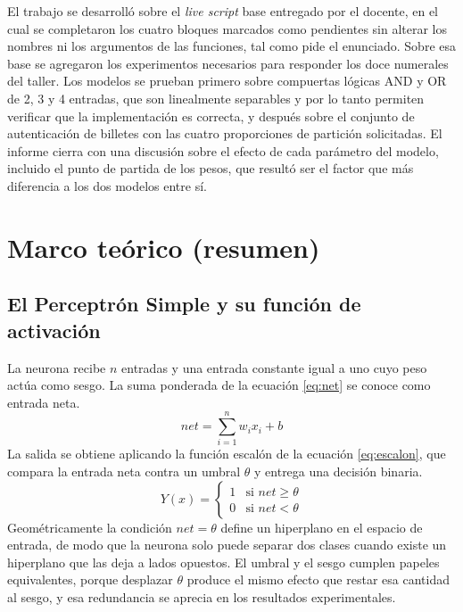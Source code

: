 \documentclass[11pt,letterpaper]{article}
\begin{document}
El trabajo se desarrolló sobre el \textit{live script} base entregado por el docente, en el cual se completaron los cuatro bloques marcados como pendientes sin alterar los nombres ni los argumentos de las funciones, tal como pide el enunciado. Sobre esa base se agregaron los experimentos necesarios para responder los doce numerales del taller. Los modelos se prueban primero sobre compuertas lógicas AND y OR de 2, 3 y 4 entradas, que son linealmente separables y por lo tanto permiten verificar que la implementación es correcta, y después sobre el conjunto de autenticación de billetes con las cuatro proporciones de partición solicitadas. El informe cierra con una discusión sobre el efecto de cada parámetro del modelo, incluido el punto de partida de los pesos, que resultó ser el factor que más diferencia a los dos modelos entre sí.

\section{Marco teórico (resumen)}

\subsection{El Perceptrón Simple y su función de activación}

La neurona recibe $n$ entradas y una entrada constante igual a uno cuyo peso actúa como sesgo. La suma ponderada de la ecuación \eqref{eq:net} se conoce como entrada neta.
\begin{equation}
    net = \sum_{i=1}^{n} w_i x_i + b
    \label{eq:net}
\end{equation}
La salida se obtiene aplicando la función escalón de la ecuación \eqref{eq:escalon}, que compara la entrada neta contra un umbral $\theta$ y entrega una decisión binaria.
\begin{equation}
    Y(x) = \begin{cases} 1 & \text{si } net \geq \theta \\ 0 & \text{si } net < \theta \end{cases}
    \label{eq:escalon}
\end{equation}
Geométricamente la condición $net = \theta$ define un hiperplano en el espacio de entrada, de modo que la neurona solo puede separar dos clases cuando existe un hiperplano que las deja a lados opuestos. El umbral y el sesgo cumplen papeles equivalentes, porque desplazar $\theta$ produce el mismo efecto que restar esa cantidad al sesgo, y esa redundancia se aprecia en los resultados experimentales.
\end{document}
